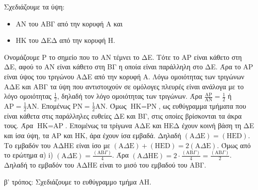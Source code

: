 \begin{alist}
\begin{rlist}
        Σχεδιάζουμε τα ύψη:
        \begin{itemize}
            \item ΑΝ του ΑΒΓ από την κορυφή Α και
            \item ΗΚ του ΔΕΔ από την κορυφή Η.
        \end{itemize}
        Ονομάζουμε P το σημείο που το ΑΝ τέμνει το ΔΕ. Τότε το AP είναι κάθετο στη ΔΕ, αφού το ΑΝ είναι κάθετο στη ΒΓ η οποία είναι παράλληλη στο ΔΕ. Άρα το AP είναι ύψος του τριγώνου ΑΔΕ από την κορυφή Α.
        Λόγω ομοιότητας των τριγώνων ΑΔΕ και ΑΒΓ τα ύψη που αντιστοιχούν σε ομόλογες πλευρές είναι ανάλογα με το λόγο ομοιότητας $\frac{1}{2}$, δηλαδή τον λόγο ομοιότητας των τριγώνων.
        Άρα $\frac{\text{AP}}{\text{AN}} = \frac{1}{2}$ ή $\text{AP} = \frac{1}{2}\text{AN}$. Επομένως $\text{PN} = \frac{1}{2}\text{AN}$.
        Όμως $\text{HK} = \text{PN}$, ως ευθύγραμμα τμήματα που είναι κάθετα στις παράλληλες ευθείες ΔΕ και ΒΓ, στις οποίες βρίσκονται τα άκρα τους. Άρα $\text{HK} = \text{AP}$.
        Επομένως τα τρίγωνα ΑΔΕ και ΗΕΔ έχουν κοινή βάση τη ΔΕ και ίσα ύψη, τα ΑP και ΗΚ, άρα έχουν ίσα εμβαδά. Δηλαδή $(\text{A}\Delta\text{E}) = (\text{HED})$.
        Το εμβαδόν του ΑΔΗΕ είναι ίσο με $(\text{A}\Delta\text{E}) + (\text{HED}) = 2(\text{A}\Delta\text{E})$.
        Όμως από το ερώτημα α) i) $(\text{A}\Delta\text{E}) = \frac{(\text{AB}\Gamma)}{4}$. Άρα $(\text{A}\Delta\text{H}\text{E}) = 2 \cdot \frac{(\text{AB}\Gamma)}{4} = \frac{(\text{AB}\Gamma)}{2}$.
        Δηλαδή το εμβαδόν του ΑΔΗΕ είναι το μισό του εμβαδού του ΑΒΓ. 
    \end{rlist}
    \item \begin{rlist}
        \item β' τρόπος: Σχεδιάζουμε το ευθύγραμμο τμήμα ΑΗ.
        \begin{figure} %
            \centering
\end{figure}
\end{rlist}
\end{alist}
